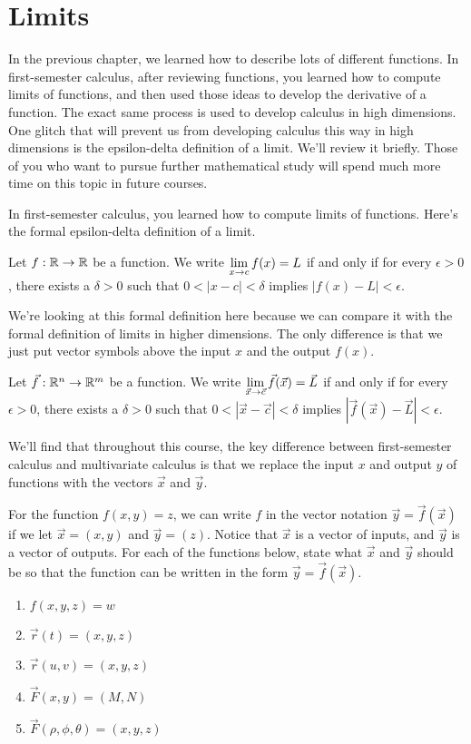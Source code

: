 \section{Limits}
In the previous chapter, we learned how to describe lots of different functions. In first-semester calculus, after reviewing functions, you learned how to compute limits of functions, and then used those ideas to develop the derivative of a function. The exact same process is used to develop calculus in high dimensions. One glitch that will prevent us from developing calculus this way in high dimensions is the epsilon-delta definition of a limit.  We'll review it briefly.  Those of you who want to pursue further mathematical study will spend much more time on this topic in future courses. 

In first-semester calculus, you learned how to compute limits of functions. Here's the formal epsilon-delta definition of a limit. 
\begin{definition}
 Let $f:\mathbb{R}\to\mathbb{R}$ be a function.
 We write $\displaystyle \lim_{x\to c} f(x)=L$ if and only if for every $\epsilon>0$, there exists a $\delta>0$ such that $0<|x-c|<\delta$ implies $|f(x)-L|<\epsilon$.
\end{definition}
 We're looking at this formal definition here because we can compare it with the formal definition of limits in higher dimensions. The only difference is that we just put vector symbols above the input $x$ and the output $f(x)$.
\begin{definition}
 Let $\vec f:\mathbb{R}^n\to\mathbb{R}^m$ be a function.
 We write $\displaystyle \lim_{\vec x\to \vec c} \vec f(\vec x)=\vec L$ if and only if for every $\epsilon>0$, there exists a $\delta>0$ such that $0<|\vec x-\vec c|<\delta$ implies $|\vec f(\vec x)-\vec L|<\epsilon$.
\end{definition}
We'll find that throughout this course, the key difference between first-semester calculus and multivariate calculus is that we replace the input $x$ and output $y$ of functions with the vectors $\vec x$ and $\vec y$. 
 
\begin{problem}
 For the function $f(x,y)=z$, we can write $f$ in the vector notation $\vec y=\vec f(\vec x)$ if we let $\vec x=(x,y)$ and $\vec y=(z)$. Notice that $\vec x$ is a vector of inputs, and $\vec y$ is a vector of outputs. 
 For each of the functions below, state what $\vec x$ and $\vec y$ should be so that the function can be written in the form $\vec y = \vec f (\vec x)$.   
\begin{enumerate}
 \item $f(x,y,z)=w$
 \item $\vec r(t)=(x,y,z)$
 \item $\vec r(u,v)=(x,y,z)$
 \item $\vec F(x,y)=(M,N)$
 \item $\vec F(\rho,\phi,\theta)=(x,y,z)$
\end{enumerate}
\end{problem}


